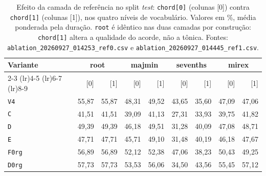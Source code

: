 \begin{table}[t]
  \centering
  \caption{Efeito da camada de referência no split \emph{test}: \texttt{chord[0]} (colunas [0]) contra \texttt{chord[1]} (colunas [1]), nos quatro níveis de vocabulário. Valores em \%, média ponderada pela duração. \texttt{root} é idêntico nas duas camadas por construção: \texttt{chord[1]} altera a qualidade do acorde, não a tônica. Fontes: \texttt{ablation\_20260927\_014253\_ref0.csv} e \texttt{ablation\_20260927\_014445\_ref1.csv}.}
  \label{tab:camadas}
  \footnotesize
  \begin{tabular}{lrrrrrrrr}
    \toprule
    Variante & \multicolumn{2}{c}{root} & \multicolumn{2}{c}{majmin} & \multicolumn{2}{c}{sevenths} & \multicolumn{2}{c}{mirex} \\
    \cmidrule(lr){2-3} \cmidrule(lr){4-5} \cmidrule(lr){6-7} \cmidrule(lr){8-9}
     & [0] & [1] & [0] & [1] & [0] & [1] & [0] & [1] \\
    \midrule
    \texttt{V4} & 55,87 & 55,87 & 48,31 & 49,52 & 43,65 & 35,60 & 47,09 & 47,06 \\
    \texttt{C} & 41,51 & 41,51 & 39,09 & 41,13 & 27,31 & 33,93 & 39,75 & 41,82 \\
    \texttt{D} & 49,39 & 49,39 & 46,18 & 49,51 & 31,28 & 40,09 & 47,08 & 48,71 \\
    \texttt{E} & 47,71 & 47,71 & 45,71 & 49,10 & 31,48 & 40,19 & 46,18 & 47,67 \\
    \texttt{F0rg} & 56,89 & 56,89 & 52,12 & 52,38 & 47,06 & 38,23 & 50,43 & 49,25 \\
    \texttt{D0rg} & 57,73 & 57,73 & 53,53 & 56,06 & 34,50 & 43,56 & 55,45 & 57,12 \\
    \bottomrule
  \end{tabular}
\end{table}
